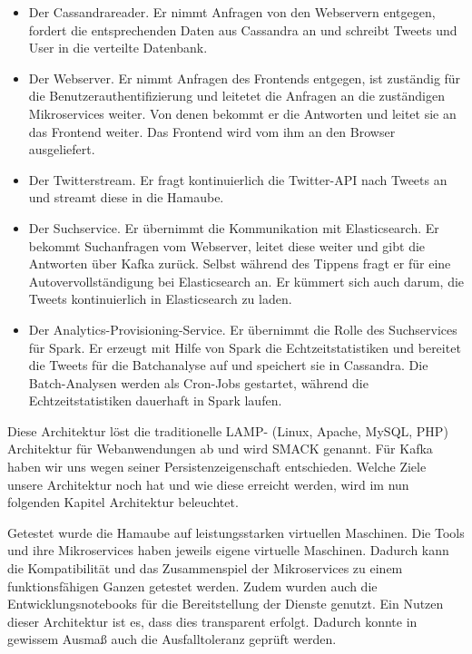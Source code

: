 \begin{itemize}
\item Der Cassandrareader. Er nimmt Anfragen von den Webservern
entgegen, fordert die entsprechenden Daten aus Cassandra an und
schreibt Tweets und User in die verteilte Datenbank.
\item Der Webserver. Er nimmt Anfragen des Frontends entgegen, ist
zuständig für die Benutzerauthentifizierung und leitetet die Anfragen
an die zuständigen Mikroservices weiter. Von denen bekommt er die
Antworten und leitet sie an das Frontend weiter. Das Frontend wird vom
ihm an den Browser ausgeliefert.
\item Der Twitterstream. Er fragt kontinuierlich die Twitter-API nach
Tweets an und streamt diese in die Hamaube.
\item Der Suchservice. Er übernimmt die Kommunikation mit Elasticsearch.
Er bekommt Suchanfragen vom Webserver, leitet diese weiter und gibt die
Antworten über Kafka zurück. Selbst während des Tippens fragt er für
eine Autovervollständigung bei Elasticsearch an. Er kümmert sich auch
darum, die Tweets kontinuierlich in Elasticsearch zu laden. 
\item Der Analytics-Provisioning-Service. Er übernimmt die Rolle des
Suchservices für Spark. Er erzeugt mit Hilfe von Spark die
Echtzeitstatistiken und bereitet die Tweets für die Batchanalyse auf
und speichert sie in Cassandra. Die Batch-Analysen werden als Cron-Jobs
gestartet, während die Echtzeitstatistiken dauerhaft in Spark laufen.
\end{itemize}
Diese Architektur löst die traditionelle LAMP- (Linux, Apache, MySQL,
PHP) Architektur für Webanwendungen ab und wird SMACK genannt. Für
Kafka haben wir uns wegen seiner Persistenzeigenschaft entschieden.
Welche Ziele unsere Architektur noch hat und wie diese erreicht werden,
wird im nun folgenden Kapitel Architektur beleuchtet.

Getestet wurde die Hamaube auf leistungsstarken virtuellen Maschinen.
Die Tools und ihre Mikroservices haben jeweils eigene virtuelle
Maschinen. Dadurch kann die Kompatibilität und das Zusammenspiel der
Mikroservices zu einem funktionsfähigen Ganzen getestet werden. Zudem
wurden auch die Entwicklungsnotebooks für die Bereitstellung der
Dienste genutzt. Ein Nutzen dieser Architektur ist es, dass dies
transparent erfolgt. Dadurch konnte in gewissem Ausmaß auch die
Ausfalltoleranz geprüft werden.
